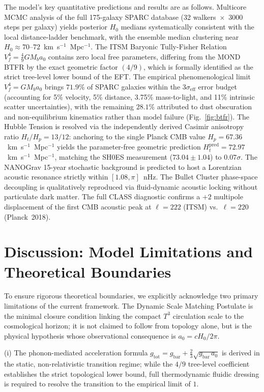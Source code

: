 \documentclass[aps,prd,10pt,twocolumn,superscriptaddress,nofootinbib,floatfix]{revtex4-2}
\begin{document}
The model's key quantitative predictions and results are as follows. Multicore MCMC analysis of the full 175-galaxy SPARC database (32 walkers~$\times$~3000 steps per galaxy) yields posterior $H_0$ medians systematically consistent with the local distance-ladder benchmark, with the ensemble median clustering near $H_0 \approx 70$--$72$~km~s$^{-1}$~Mpc$^{-1}$. The ITSM Baryonic Tully-Fisher Relation $V_f^4 = \frac{4}{9}G M_b a_0$ contains zero local free parameters, differing from the MOND BTFR by the exact geometric factor $(4/9)$, which is formally identified as the strict tree-level lower bound of the EFT. The empirical phenomenological limit $V_f^4 = G M_b a_0$ brings $71.9\%$ of SPARC galaxies within the $3\sigma_{\text{eff}}$ error budget (accounting for 5\% velocity, 5\% distance, 3.75\% mass-to-light, and 11\% intrinsic scatter uncertainties), with the remaining $28.1\%$ attributed to dust obscuration and non-equilibrium kinematics rather than model failure (Fig.~\ref{fig:btfr}). The Hubble Tension is resolved via the independently derived Casimir anisotropy ratio $H_t/H_p = 13/12$: anchoring to the single Planck CMB value $H_p = 67.36$~km~s$^{-1}$~Mpc$^{-1}$ yields the parameter-free geometric prediction $H_t^{\text{pred}} = 72.97$~km~s$^{-1}$~Mpc$^{-1}$, matching the SH0ES measurement ($73.04 \pm 1.04$) to $0.07\sigma$. The NANOGrav 15-year stochastic background is predicted to host a Lorentzian acoustic resonance strictly within $[1.08, \pi]$~nHz. The Bullet Cluster phase-space decoupling is qualitatively reproduced via fluid-dynamic acoustic locking without particulate dark matter. The full CLASS diagnostic confirms a $+2$ multipole displacement of the first CMB acoustic peak at $\ell = 222$ (ITSM) vs.~$\ell = 220$ (Planck~2018).

\section{Discussion: Model Limitations and Theoretical Boundaries}
To ensure rigorous theoretical boundaries, we explicitly acknowledge two primary limitations of the current framework. The Dynamic Scale Matching Postulate is the minimal closure condition linking the compact $T^3$ circulation scale to the cosmological horizon; it is not claimed to follow from topology alone, but is the physical hypothesis whose observational consequence is $a_0 = cH_0/2\pi$.

(i) The phonon-mediated acceleration formula $g_{\text{tot}} = g_{\text{bar}} + \frac{2}{3}\sqrt{g_{\text{bar}}\,a_0}$ is derived in the static, non-relativistic transition regime; while the $4/9$ tree-level coefficient establishes the strict topological lower bound, full thermodynamic fluidic dressing is required to resolve the transition to the empirical limit of $1$.
\end{document}
